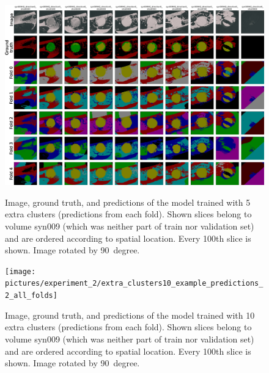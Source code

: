 \clearpage
\begin{figure}[!htb]
    \centering
    \includegraphics[clip,trim={0 0 0 7}, height=\textwidth, angle=90]{pictures/experiment_2/extra_clusters5_example_predictions_2_all_folds}\\
    \caption[Predictions with Five Extra Clusters]{Image, ground truth, and predictions of the model trained with 5 extra clusters (predictions from each fold). Shown slices belong to volume syn009 (which was neither part of train nor validation set) and are ordered according to spatial location. Every 100th slice is shown. Image rotated by 90~degree.}
    \label{fig:extra_clusters5-predictions-syn009-by-fold}
\end{figure}

\clearpage
\begin{figure}[!htb]
    \centering
    \texttt{[image: pictures/experiment\_2/extra\_clusters10\_example\_predictions\_2\_all\_folds]}\\
    \caption[Predictions with Ten Extra Clusters]{Image, ground truth, and predictions of the model trained with 10 extra clusters (predictions from each fold). Shown slices belong to volume syn009 (which was neither part of train nor validation set) and are ordered according to spatial location. Every 100th slice is shown. Image rotated by 90~degree.}
    \label{fig:extra_clusters10-predictions-syn009-by-fold}
\end{figure}
